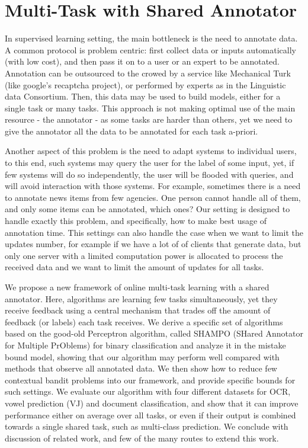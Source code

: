 \section{Multi-Task with Shared Annotator}
\label{sec:multi_task_intro}

 In supervised learning setting, the main bottleneck is the need to annotate data. A common protocol is 
 problem centric: first collect data or inputs automatically (with low cost), and then 
 pass it on to a user or an expert to be annotated. Annotation can be outsourced to the crowed by a 
 service like Mechanical Turk (like google's recaptcha project), or performed by experts as
  in the Linguistic data Consortium. Then, this data 
 may be used to build models, either for a single task or many tasks. This approach is not making optimal 
 use of the main resource - the annotator - as some tasks are harder than others, yet we need to give the 
 annotator all the data to be annotated for each task a-priori. 
 
 Another aspect of this problem is the need to adapt systems to individual users, to this end, 
 such systems may query the user for the label of some input, yet, if few systems will do so 
 independently, the user will be flooded with queries, and will avoid interaction with those systems. 
 For example, sometimes there is a need to annotate news items from few agencies. One person cannot 
 handle all of them, and only some items can be annotated, which ones? Our setting is designed to handle 
 exactly this problem, and specifically, how to make best usage of annotation time.
 This settings can also handle the case when we want to limit the updates number, 
 for example if we have a lot of of clients that generate data, but only one server with a limited computation 
 power is allocated to process the received data and we want to limit the amount of updates for all tasks.
 
 We propose a new framework of online multi-task learning with a shared annotator. 
 Here, algorithms are learning few tasks simultaneously, yet they receive feedback using a central 
 mechanism that trades off the amount of feedback (or labels) each task receives. We derive a specific 
 set of algorithms based on the good-old Perceptron algorithm, called SHAMPO (SHared Annotator for Multiple 
 PrOblems) for binary classification and analyze it in the mistake bound model, showing that our algorithm 
 may perform well compared with methods that observe all annotated data. We then show how to reduce 
 few contextual bandit problems into our framework, and provide specific bounds for such 
settings. We evaluate our algorithm with four different datasets for OCR, vowel prediction (VJ) and 
document classification, and show that it can improve performance either on average over all tasks, 
or even if their output is combined towards a single shared task, such as multi-class prediction.
 We conclude with discussion of related work, and few of the many routes to extend this work.

